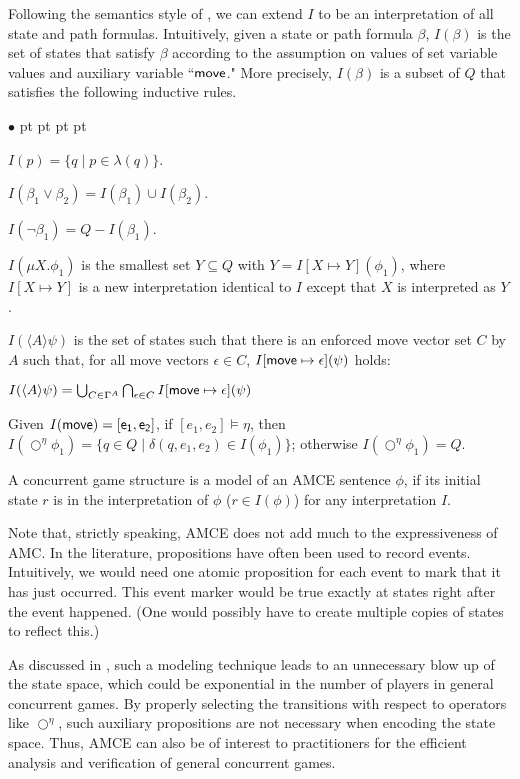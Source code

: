 \documentclass[times,10pt,twocolumn]{article}
\newcommand{\move}{\ensuremath{\sf move}}
\newcommand{\nxt}{\bigcirc}
\newenvironment{list1}{\begin{list}{$\bullet$}
{\topsep 0 pt \parsep 0 pt \partopsep 0 pt \itemsep 0
pt}}{\end{list}}
\begin{document}
Following the semantics style of \cite{AHK02}, 
we can extend $I$ to be an interpretation of all state and path formulas.  
Intuitively, given a state or path formula $\beta$, 
$I(\beta)$ is the set of states that satisfy $\beta$ according to
the assumption on values of set variable values and auxiliary 
variable ``$\move$."
More precisely, 
$I(\beta)$ is a subset of $Q$ 
that satisfies the following inductive rules. 
\begin{list1} 
\item $I(p)=\{q\mid p\in \lambda(q)\}$. 
\item $I(\beta_1\vee\beta_2)=I(\beta_1)\cup I(\beta_2)$. 
\item $I(\neg\beta_1)=Q-I(\beta_1)$.

\item $I(\mu X.\phi_1)$ is the smallest set $Y\subseteq Q$ 
  with $Y=I[X\mapsto Y](\phi_1)$, where 
  $I[X\mapsto Y]$ is a new interpretation identical to $I$ 
  except that $X$ is interpreted as $Y$.

\item $I(\langle A\rangle \psi)$ is the set of states 
such that there is an enforced move vector set $C$ by $A$ such that, for all move vectors $\epsilon \in C$,  
  $I[\move\mapsto \epsilon](\psi)$ holds:
  \begin{center} 
  $I(\langle A\rangle \psi) = 
  \bigcup_{C \in\Gamma^A}
  \bigcap_{\epsilon \in C} I[\move\mapsto \epsilon](\psi)$ 
  \end{center} 
\item Given $I(\move)=[e_1,e_2]$, 
  if $[e_1,e_2]\models \eta$, then  
$I(\nxt^\eta \phi_1) = \{q \in Q \mid \delta(q,e_1,e_2) \in I(\phi_1)\}$; 
otherwise $I(\nxt^\eta \phi_1) = Q$.  

\end{list1} 
A concurrent game structure is a model of an AMCE sentence $\phi$, if its initial state $r$ is in the interpretation of $\phi$ ($r \in I(\phi)$) for any interpretation $I$.

Note that, strictly speaking, AMCE does not add much to the 
expressiveness of AMC.  
In the literature, propositions have often been used to 
record events.  
Intuitively, we would need one atomic proposition for each event to mark that it has just occurred.
This event marker would be true exactly at states right after the event happened. 
(One would possibly have to create multiple copies of states to reflect this.)
 
As discussed in \cite{Wang04}, such a modeling technique leads to an unnecessary 
blow up of the state space, which could be exponential in the number 
of players in general concurrent games.  
\label{reply1.event.blowup} 
By properly selecting 
the transitions with respect to operators like $\nxt^\eta$, 
such auxiliary propositions are not necessary when encoding the state space.  
Thus, AMCE can also be of interest to practitioners for the
efficient analysis and verification of general concurrent games.
\end{document}
